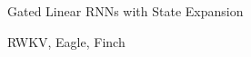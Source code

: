 \begin{slidewhite}[\slideopts,toc={HGRN2}]{Gated Linear RNNs with State Expansion}
\vspace{-6em}
\end{slidewhite}

\begin{slidewhite}[\slideopts,toc={RWKV+}]{RWKV, Eagle, Finch}
\vspace{-6em}
\end{slidewhite}


%
%
%
%


\endinput
